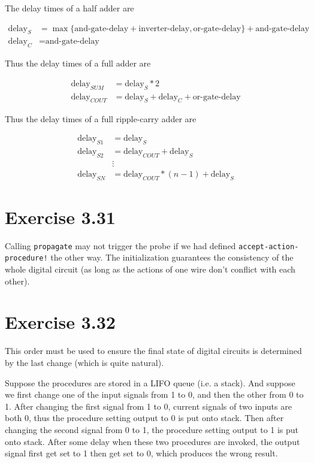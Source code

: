 \documentclass[../main.tex]{subfiles}
\begin{document}
The delay times of a half adder are

\begin{align*}
\text{delay}_{S} &= \max \{ \text{and-gate-delay} + \text{inverter-delay}, \text{or-gate-delay} \} + \text{and-gate-delay} \\
\text{delay}_{C} &= \text{and-gate-delay}
\end{align*}

Thus the delay times of a full adder are

\begin{align*}
\text{delay}_{SUM} &= \text{delay}_{S} * 2 \\
\text{delay}_{COUT} &= \text{delay}_{S} + \text{delay}_{C} + \text{or-gate-delay}
\end{align*}

Thus the delay times of a full ripple-carry adder are

\begin{align*}
\text{delay}_{S1} &= \text{delay}_{S} \\
\text{delay}_{S2} &= \text{delay}_{COUT} + \text{delay}_{S} \\
&\vdots \\
\text{delay}_{SN} &= \text{delay}_{COUT} * (n - 1) + \text{delay}_{S}
\end{align*}

\section{Exercise 3.31}

Calling \lstinline{propagate} may not trigger the probe if we
had defined \lstinline{accept-action-procedure!} the other way.
The initialization guarantees the consistency of the whole
digital circuit (as long as the actions of one wire don't conflict
with each other).

\section{Exercise 3.32}

This order must be used to ensure the final state of digital
circuits is determined by the last change (which is quite natural).

Suppose the procedures are stored in a LIFO queue (i.e. a stack).
And suppose we first change one of the input signals from 1 to 0, and then
the other from 0 to 1. After changing the first signal from 1 to 0,
current signals of two inputs are both 0, thus the procedure setting
output to 0 is put onto stack. Then after changing the second signal
from 0 to 1, the procedure setting output to 1 is put onto stack.
After some delay when these two procedures are invoked, the output
signal first get set to 1 then get set to 0, which produces the wrong result.
\end{document}
